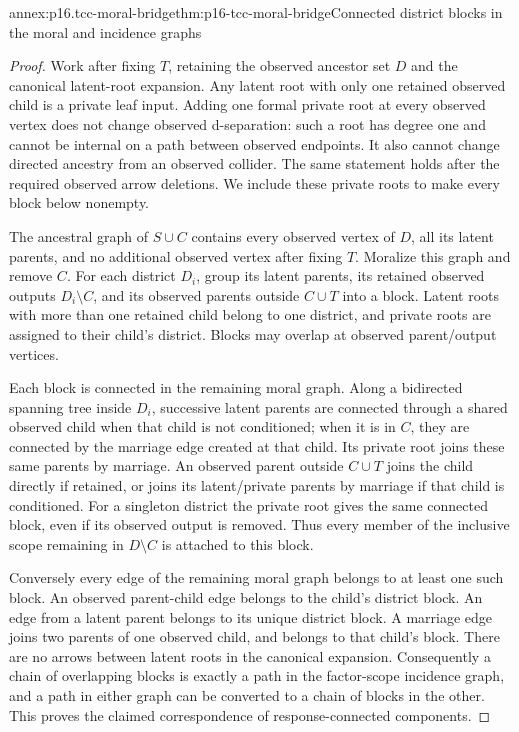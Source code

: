\begin{annexitem}{annex:p16.tcc-moral-bridge}{thm:p16-tcc-moral-bridge}{Connected district blocks in the moral and incidence graphs}
\begin{proof}
Work after fixing \(T\), retaining the observed ancestor set
\(D\) and the canonical latent-root expansion. Any latent
root with only one retained observed child is a private leaf
input. Adding one formal private root at every observed vertex
does not change observed d-separation: such a root has degree
one and cannot be internal on a path between observed endpoints.
It also cannot change directed ancestry from an observed collider.
The same statement holds after the required observed arrow deletions.
We include these private roots to make every block below nonempty.

The ancestral graph of \(S\cup C\) contains every observed
vertex of \(D\), all its latent parents, and no additional
observed vertex after fixing \(T\). Moralize this graph and
remove \(C\). For each district \(D_i\), group its latent
parents, its retained observed outputs \(D_i\setminus C\),
and its observed parents outside \(C\cup T\) into a block.
Latent roots with more than one retained child belong to one
district, and private roots are assigned to their child's district.
Blocks may overlap at observed parent/output vertices.

Each block is connected in the remaining moral graph. Along a
bidirected spanning tree inside \(D_i\), successive latent
parents are connected through a shared observed child when that
child is not conditioned; when it is in \(C\), they are
connected by the marriage edge created at that child. Its private
root joins these same parents by marriage. An observed parent
outside \(C\cup T\) joins the child directly if retained,
or joins its latent/private parents by marriage if that child
is conditioned. For a singleton district the private root gives
the same connected block, even if its observed output is removed.
Thus every member of the inclusive scope remaining in \(D\setminus C\)
is attached to this block.

Conversely every edge of the remaining moral graph belongs to
at least one such block. An observed parent-child edge belongs
to the child's district block. An edge from a latent parent
belongs to its unique district block. A marriage edge joins two
parents of one observed child, and belongs to that child's block.
There are no arrows between latent roots in the canonical expansion.
Consequently a chain of overlapping blocks is exactly a path in
the factor-scope incidence graph, and a path in either graph
can be converted to a chain of blocks in the other. This proves
the claimed correspondence of response-connected components.


\end{proof}
\end{annexitem}
